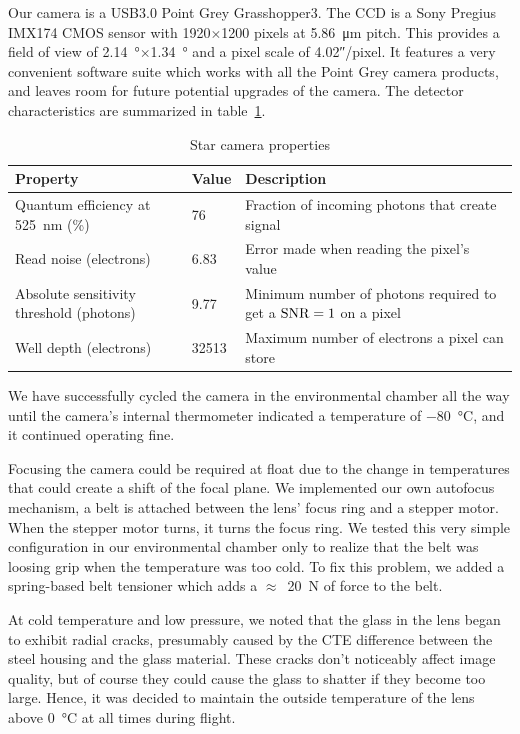Our camera is a USB3.0 Point Grey Grasshopper3. The CCD is a Sony Pregius IMX174 CMOS sensor with 1920$\times$1200 pixels at \SI{5.86}{\um} pitch. This provides a field of view of \SI{2.14}{\degree}$\times$\SI{1.34}{\degree} and a pixel scale of \ang{;;4.02}/pixel. It features a very convenient software suite which works with all the Point Grey camera products, and leaves room for future potential upgrades of the camera. The detector characteristics are summarized in table~\ref{tab:starcamproperties}.

\renewcommand{\arraystretch}{1.5}
\begin{table}[htbp]
\small
\begin{tabular}{|p{4cm}|p{1cm}|p{8.5cm}|}
\hline
Property & Value & Description \\
\hline
Quantum efficiency at \SI{525}{\nm} (\%) & 76 & Fraction of incoming photons that create signal \\
\hline
Read noise (electrons) & 6.83 & Error made when reading the pixel's value \\
\hline
Absolute sensitivity threshold (photons) & 9.77 & Minimum number of photons required to get a $\textrm{SNR}=1$ on a pixel\\
\hline
Well depth (electrons) & \num{32513} & Maximum number of electrons a pixel can store\\
\hline
\end{tabular}
\label{tab:starcamproperties}
\caption[Star camera properties]{Star camera properties}
\end{table}

We have successfully cycled the camera in the environmental chamber all the way until the camera's internal thermometer indicated a temperature of \SI{-80}{\celsius}, and it continued operating fine.

Focusing the camera could be required at float due to the change in temperatures that could create a shift of the focal plane. We implemented our own autofocus mechanism, a belt is attached between the lens' focus ring and a stepper motor. When the stepper motor turns, it turns the focus ring. We tested this very simple configuration in our environmental chamber only to realize that the belt was loosing grip when the temperature was too cold. To fix this problem, we added a spring-based belt tensioner which adds a $\approx$~\SI{20}{\newton} of force to the belt.

At cold temperature and low pressure, we noted that the glass in the lens began to exhibit radial cracks, presumably caused by the CTE difference between the steel housing and the glass material. These cracks don't noticeably affect image quality, but of course they could cause the glass to shatter if they become too large. Hence, it was decided to maintain the outside temperature of the lens above \SI{0}{\celsius} at all times during flight.


